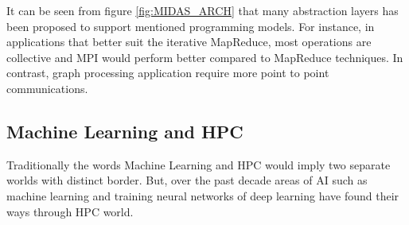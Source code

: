 \documentclass[runningheads,a4paper]{llncs}
\begin{document}
It can be seen from figure \ref{fig:MIDAS_ARCH} that many abstraction layers has been proposed to support mentioned programming models. For instance, in applications that better suit the iterative MapReduce, most operations are collective and MPI would perform better compared to MapReduce techniques. In contrast, graph processing application require more point to point communications.\\
%
%


\newpage
\subsection{Machine Learning and HPC}
Traditionally the words Machine Learning and HPC would imply two separate worlds with distinct border. But, over the past decade areas of AI such as machine learning and training neural networks of deep learning have found their ways through HPC world.\\
\end{document}

